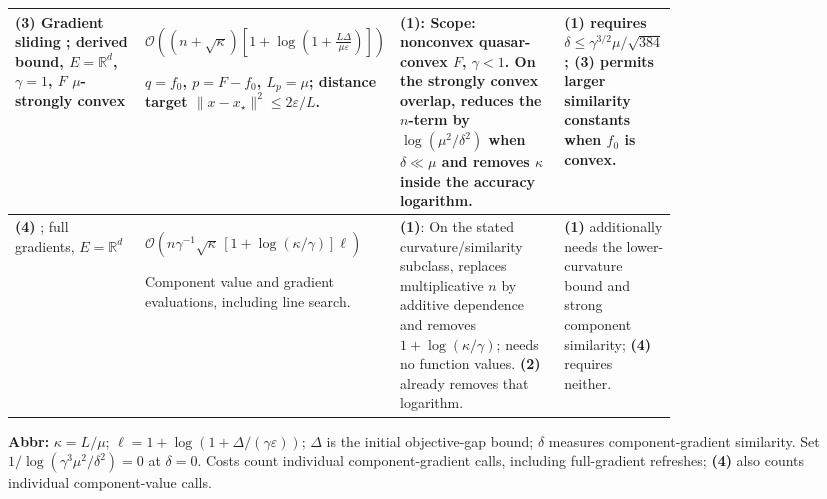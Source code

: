 \begin{table}[tp]
\begin{threeparttable}
\begin{tabularx}{\linewidth}{@{}>{\raggedright\arraybackslash}p{0.20\linewidth}>{\raggedright\arraybackslash}p{0.32\linewidth}>{\raggedright\arraybackslash}p{0.25\linewidth}>{\raggedright\arraybackslash}X@{}}
\midrule
\textbf{(3)} Gradient sliding \citep[Thm.~3]{sfqKovalev2022v1}; derived bound, $E=\mathbb R^d$, $\gamma=1$, $F$ $\mu$-strongly convex
& $\mathcal{O}\!\left((n+\sqrt\kappa)\left[1+\log\!\left(1+\frac{L\Delta}{\mu\varepsilon}\right)\right]\right)$\par $q=f_0$, $p=F-f_0$, $L_p=\mu$; distance target $\|x-x_\star\|^2\le2\varepsilon/L$.
& \textbf{(1)}: Scope: nonconvex quasar-convex $F$, $\gamma<1$. On the strongly convex overlap, reduces the $n$-term by $\log(\mu^2/\delta^2)$ when $\delta\ll\mu$ and removes $\kappa$ inside the accuracy logarithm.
& \textbf{(1)} requires $\delta\le\gamma^{3/2}\mu/\sqrt{384}$; \textbf{(3)} permits larger similarity constants when $f_0$ is convex. \\
\midrule
\textbf{(4)} \citep[Thm.~1]{csqHinder2020}; full gradients, $E=\mathbb R^d$
& $\mathcal{O}\!\left(n\gamma^{-1}\sqrt\kappa\,[1+\log(\kappa/\gamma)]\ell\right)$\par Component value and gradient evaluations, including line search.
& \textbf{(1)}: On the stated curvature/similarity subclass, replaces multiplicative $n$ by additive dependence and removes $1+\log(\kappa/\gamma)$; needs no function values. \textbf{(2)} already removes that logarithm.
& \textbf{(1)} additionally needs the lower-curvature bound and strong component similarity; \textbf{(4)} requires neither. \\
\bottomrule
\end{tabularx}
\begin{tablenotes}[flushleft]\footnotesize
\item[] \textbf{Abbr:} $\kappa=L/\mu$; $\ell=1+\log(1+\Delta/(\gamma\varepsilon))$; $\Delta$ is the initial objective-gap bound; $\delta$ measures component-gradient similarity. Set $1/\log(\gamma^3\mu^2/\delta^2)=0$ at $\delta=0$. Costs count individual component-gradient calls, including full-gradient refreshes; \textbf{(4)} also counts individual component-value calls.
\end{tablenotes}
\end{threeparttable}
\end{table}
\clearpage
